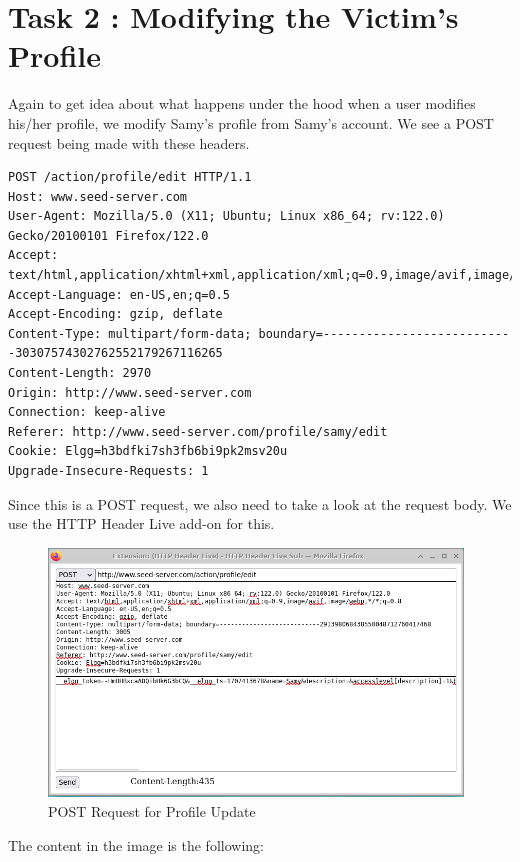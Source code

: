 \documentclass[12pt]{article}
\begin{document}
\newpage


\section*{Task 2 : Modifying the Victim’s Profile}
Again to get idea about what happens under the hood when a user modifies his/her profile, we modify Samy's profile from Samy's account. We see a POST request being made with these headers.

\begin{verbatim}
POST /action/profile/edit HTTP/1.1
Host: www.seed-server.com
User-Agent: Mozilla/5.0 (X11; Ubuntu; Linux x86_64; rv:122.0) Gecko/20100101 Firefox/122.0
Accept: text/html,application/xhtml+xml,application/xml;q=0.9,image/avif,image/webp,*/*;q=0.8
Accept-Language: en-US,en;q=0.5
Accept-Encoding: gzip, deflate
Content-Type: multipart/form-data; boundary=---------------------------30307574302762552179267116265
Content-Length: 2970
Origin: http://www.seed-server.com
Connection: keep-alive
Referer: http://www.seed-server.com/profile/samy/edit
Cookie: Elgg=h3bdfki7sh3fb6bi9pk2msv20u
Upgrade-Insecure-Requests: 1
\end{verbatim}

Since this is a POST request, we also need to take a look at the request body. We use the HTTP Header Live add-on for this.

     \begin{figure}[H]
         \centering
         \includegraphics[width=0.98\textwidth]{Images/ss2.png}
         \caption{POST Request for Profile Update}
         \label{fig:ss2}
     \end{figure}


The content in the image is the following:
\end{document}
